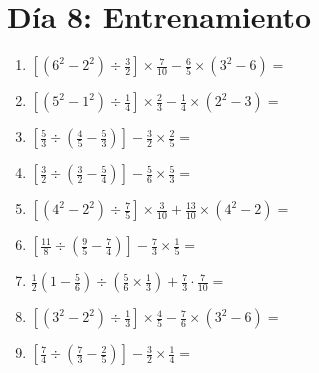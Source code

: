 \documentclass[12pt]{article}
\begin{document}
\section*{Día 8: Entrenamiento}
\begin{enumerate}[ itemsep=1.5cm]
	\item $\displaystyle \left[ \left( 6^2 - 2^2 \right) \div \frac{3}{2} \right] \times \frac{7}{10} - \frac{6}{5} \times \left( 3^2 - 6 \right) =$
	\item $\displaystyle \left[ \left( 5^2 - 1^2 \right) \div \frac{1}{4} \right] \times \frac{2}{3} - \frac{1}{4} \times \left( 2^2 - 3 \right) =$
	\item $\displaystyle \left[ \frac{5}{3} \div \left( \frac{4}{5} - \frac{5}{3} \right) \right] - \frac{3}{2} \times \frac{2}{5} =$
	\item $\displaystyle \left[ \frac{3}{2} \div \left( \frac{3}{2} - \frac{5}{4} \right) \right] - \frac{5}{6} \times \frac{5}{3} =$
	\item $\displaystyle \left[ \left( 4^2 - 2^2 \right) \div \frac{7}{5} \right] \times \frac{3}{10} + \frac{13}{10} \times \left( 4^2 - 2 \right) =$
	\item $\displaystyle \left[ \frac{11}{8} \div \left( \frac{9}{5} - \frac{7}{4} \right) \right] - \frac{7}{3} \times \frac{1}{5} =$
	\item $\displaystyle \frac{1}{2} \left( 1 - \frac{5}{6} \right) \div \left( \frac{5}{6} \times \frac{1}{3} \right) + \frac{7}{3} \cdot \frac{7}{10} =$
	\item $\displaystyle \left[ \left( 3^2 - 2^2 \right) \div \frac{1}{3} \right] \times \frac{4}{5} - \frac{7}{6} \times \left( 3^2 - 6 \right) =$
	\item $\displaystyle \left[ \frac{7}{4} \div \left( \frac{7}{3} - \frac{2}{5} \right) \right] - \frac{3}{2} \times \frac{1}{4} =$


\end{enumerate}
\end{document}
